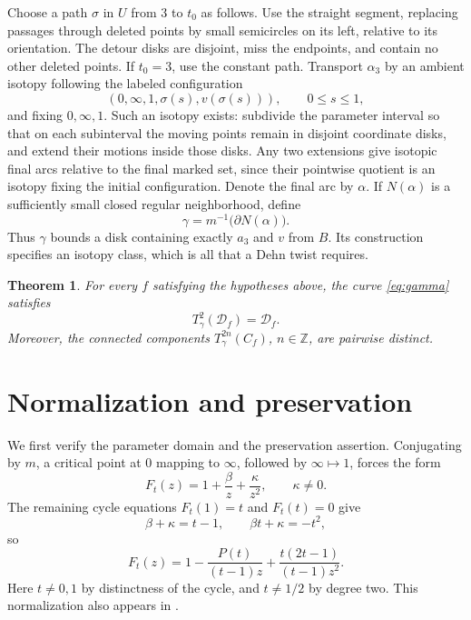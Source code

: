 \documentclass[11pt]{article}
\newcommand{\Z}{\mathbb Z}
\newcommand{\D}{\mathcal D}
\newtheorem{theorem}{Theorem}[section]
\theoremstyle{remark}
\begin{document}
Choose a path $\sigma$ in $U$ from $3$ to $t_0$ as follows. Use the straight segment, replacing passages through deleted points by small semicircles on its left, relative to its orientation. The detour disks are disjoint, miss the endpoints, and contain no other deleted points. If $t_0=3$, use the constant path. Transport $\alpha_3$ by an ambient isotopy following the labeled configuration
\begin{equation}\label{eq:config}
 (0,\infty,1,\sigma(s),v(\sigma(s))),\qquad 0\leq s\leq1,
\end{equation}
and fixing $0,\infty,1$. Such an isotopy exists: subdivide the parameter interval so that on each subinterval the moving points remain in disjoint coordinate disks, and extend their motions inside those disks. Any two extensions give isotopic final arcs relative to the final marked set, since their pointwise quotient is an isotopy fixing the initial configuration. Denote the final arc by $\alpha$. If $N(\alpha)$ is a sufficiently small closed regular neighborhood, define
\begin{equation}\label{eq:gamma}
 \gamma=m^{-1}\bigl(\partial N(\alpha)\bigr).
\end{equation}
Thus $\gamma$ bounds a disk containing exactly $a_3$ and $v$ from $B$. Its construction specifies an isotopy class, which is all that a Dehn twist requires.


\begin{theorem}\label{thm:main}
For every $f$ satisfying the hypotheses above, the curve \eqref{eq:gamma} satisfies
\[
 T_\gamma^2(\D_f)=\D_f.
\]
Moreover, the connected components $T_\gamma^{2n}(C_f)$, $n\in\Z$, are pairwise distinct.
\end{theorem}

\section{Normalization and preservation}
We first verify the parameter domain and the preservation assertion. Conjugating by $m$, a critical point at $0$ mapping to $\infty$, followed by $\infty\mapsto1$, forces the form
\[
 F_t(z)=1+\frac{\beta}{z}+\frac{\kappa}{z^2},\qquad \kappa\ne0.
\]
The remaining cycle equations $F_t(1)=t$ and $F_t(t)=0$ give
\[
 \beta+\kappa=t-1,\qquad \beta t+\kappa=-t^2,
\]
so
\begin{equation}\label{eq:Ft}
 F_t(z)=1-\frac{P(t)}{(t-1)z}
          +\frac{t(2t-1)}{(t-1)z^2}.
\end{equation}
Here $t\ne0,1$ by distinctness of the cycle, and $t\ne1/2$ by degree two. This normalization also appears in \cite[Section 6]{FKS}.
\end{document}
